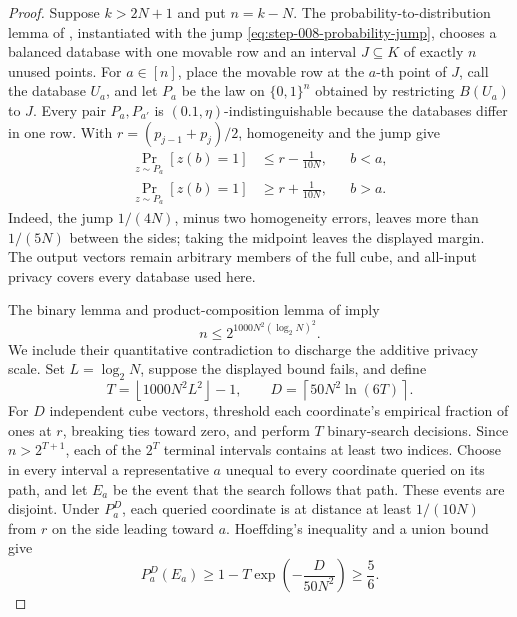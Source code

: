 \begin{proof}
Suppose \(k>2N+1\) and put \(n=k-N\).  The probability-to-distribution
lemma of \citet{alonLivniMalliarisMoran2019}, instantiated with the jump
\eqref{eq:step-008-probability-jump}, chooses a balanced database with one
movable row and an interval \(J\subseteq K\) of exactly \(n\) unused
points.  For \(a\in[n]\), place the movable row at the \(a\)-th point of
\(J\), call the database \(U_a\), and let \(P_a\) be the law on
\(\{0,1\}^n\) obtained by restricting \(B(U_a)\) to \(J\).  Every pair
\(P_a,P_{a'}\) is \((0.1,\eta)\)-indistinguishable because the databases
differ in one row.  With \(r=(p_{j-1}+p_j)/2\), homogeneity and the jump
give
\begin{equation}\label{eq:step-008-cube-margin}
\begin{aligned}
\Pr_{z\sim P_a}[z(b)=1]&\le r-\frac1{10N},&&b<a,\\
\Pr_{z\sim P_a}[z(b)=1]&\ge r+\frac1{10N},&&b>a.
\end{aligned}
\end{equation}
Indeed, the jump \(1/(4N)\), minus two homogeneity errors, leaves more
than \(1/(5N)\) between the sides; taking the midpoint leaves the displayed
margin.  The output vectors remain arbitrary members of the full cube, and
all-input privacy covers every database used here.

The binary lemma and product-composition lemma of
\citet{alonLivniMalliarisMoran2019} imply
\begin{equation}\label{eq:step-008-binary-upper}
n\le2^{1000N^2(\log_2N)^2}.
\end{equation}
We include their quantitative contradiction to discharge the additive
privacy scale.  Set \(L=\log_2N\), suppose the displayed bound fails, and
define
\begin{equation}\label{eq:step-008-binary-parameters}
T=\left\lfloor1000N^2L^2\right\rfloor-1,
\qquad
D=\left\lceil50N^2\ln(6T)\right\rceil.
\end{equation}
For \(D\) independent cube vectors, threshold each coordinate's empirical
fraction of ones at \(r\), breaking ties toward zero, and perform \(T\)
binary-search decisions.  Since \(n>2^{T+1}\), each of the \(2^T\)
terminal intervals contains at least two indices.  Choose in every interval
a representative \(a\) unequal to every coordinate queried on its path,
and let \(E_a\) be the event that the search follows that path.  These
events are disjoint.  Under \(P_a^D\), each queried coordinate is at
distance at least \(1/(10N)\) from \(r\) on the side leading toward
\(a\).  Hoeffding's inequality \citep{hoeffding1963} and a union bound give
\begin{equation}\label{eq:step-008-path-probability}
P_a^D(E_a)
\ge1-T\exp\!\left(-\frac{D}{50N^2}\right)
\ge\frac56.
\end{equation}


\end{proof}
